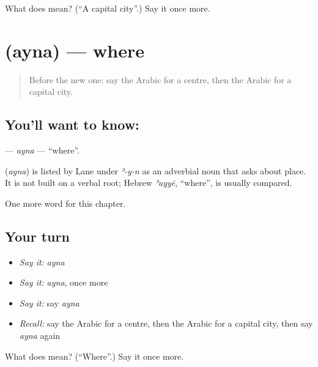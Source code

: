 \begin{tcolorbox}[breakable,colback=teal!4,colframe=teal!35!black,title={Before you move on}]
What does  mean? (\textquotedblleft{}A capital city\textquotedblright{}.) Say it once more.
\end{tcolorbox}
\section[\texorpdfstring{\ar{أين} (ayna)}{أين (ayna)}]{ (ayna) — where}

\label{lesson:AR-C204-ayna}



\begin{quote}
Before the new one: say the Arabic for a centre, then the Arabic for a capital city.
\end{quote}

\subsection*{You'll want to know: }
\textbf{} — \emph{ayna} — \textquotedblleft{}where\textquotedblright{}.

\begin{cousinweb}
\textbf{} (\emph{ayna}) is listed by Lane under \emph{ʾ-y-n} as an adverbial noun that asks about place. It is not built on a verbal root; Hebrew \emph{ʾayyē}, \textquotedblleft{}where\textquotedblright{}, is usually compared.
\end{cousinweb}

\begin{grammarlens}[title={What you've built}]
One more word for this chapter.
\end{grammarlens}

\subsection*{Your turn}
\begin{itemize}
\raggedright
  \item \emph{Say it:} \emph{ayna}
  \item \emph{Say it:} \emph{ayna}, once more
  \item \emph{Say it:} say \emph{ayna}
  \item \emph{Recall:} say the Arabic for a centre, then the Arabic for a capital city, then say \emph{ayna} again
\end{itemize}

\begin{tcolorbox}[breakable,colback=teal!4,colframe=teal!35!black,title={Before you move on}]
What does  mean? (\textquotedblleft{}Where\textquotedblright{}.) Say it once more.
\end{tcolorbox}
